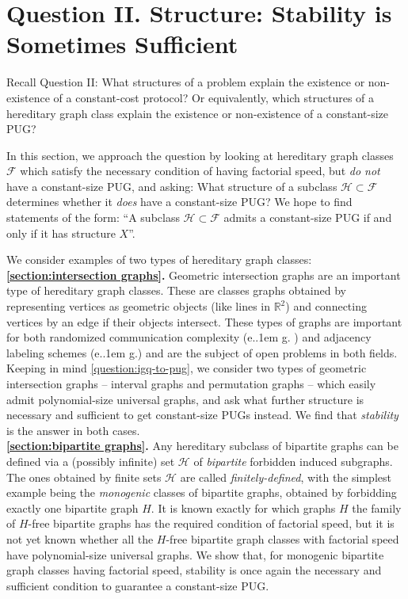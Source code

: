\documentclass{theoretics}
\makeatletter
\newcommand{\cF}{\ensuremath{\mathcal{F}}}
\newcommand{\cH}{\ensuremath{\mathcal{H}}}
\newcommand{\bR}{\ensuremath{\mathbb{R}}}
\newcommand*\eg{e.\kern.1em g.\@\xspace} %
\makeatother
\begin{document}
\section{Question II. Structure: Stability is Sometimes Sufficient} 
\label{section:stability}

Recall Question II: What structures of a problem explain the existence or non-existence of a
constant-cost protocol? Or equivalently, which structures of a hereditary graph class explain the
existence or non-existence of a constant-size PUG?

In this section, we approach the question by looking at hereditary graph classes $\cF$ which satisfy
the necessary condition of having factorial speed, but \emph{do not} have a constant-size PUG, and
asking: What structure of a subclass $\cH \subset \cF$ determines whether it \emph{does} have a
constant-size PUG? We hope to find statements of the form: ``A subclass $\cH \subset \cF$ admits a
constant-size PUG if and only if it has structure $X$''.

We consider examples of two types of hereditary graph classes:\\

\noindent
\textbf{\cref{section:intersection graphs}.} Geometric intersection graphs are an important type of
hereditary graph classes. These are classes graphs obtained by representing vertices as geometric
objects (like lines in $\bR^2$) and connecting vertices by an edge if their objects intersect. These
types of graphs are important for both randomized communication complexity (\eg
\cite{PS86,HHPTZ22,HHM23,HZ23}) and adjacency labeling schemes (\eg \cite{Spin03,Fit19}) and are the
subject of open problems in both fields. Keeping in mind \cref{question:igq-to-pug}, we consider two
types of geometric intersection graphs -- interval graphs and permutation graphs -- which easily
admit polynomial-size universal graphs, and ask what further structure is necessary and sufficient
to get constant-size PUGs instead. We find that \emph{stability} is the answer in both cases.\\

\noindent
\textbf{\cref{section:bipartite graphs}.}
Any hereditary subclass of bipartite graphs can be defined via a (possibly infinite) set $\cH$
of \emph{bipartite} forbidden induced subgraphs. The ones obtained by finite sets $\cH$ are called
\emph{finitely-defined}, with the simplest example being the \emph{monogenic} classes of bipartite
graphs, obtained by forbidding exactly one bipartite graph $H$. It is known exactly for which graphs
$H$ the family of $H$-free bipartite graphs has the required condition of factorial speed, but it is
not yet known whether all the $H$-free bipartite graph classes with factorial speed have
polynomial-size universal graphs. We show that, for monogenic bipartite graph classes having
factorial speed, stability is once again the necessary and sufficient condition to guarantee a
constant-size PUG.
\end{document}
